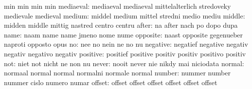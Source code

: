                            min                       min
                           min                       min
                mediaeval: mediaeval                 mediaeval
                           mittelalterlich           stredoveky
                           medievale                 medieval
                   medium: middel                    medium
                           mittel                    stredni
                           medio                     mediu
                   middle: midden                    middle
                           mittig                    nastred
                           centro                    centru
                    after: na                        after
                           nach                      po
                           dopo                      dupa
                     name: naam                      name
                           name                      jmeno
                           nome                      nume
                 opposite: naast                     opposite
                           gegenueber                naproti
                           opposto                   opus
                       no: nee                       no
                           nein                      ne
                           no                        nu
                 negative: negatief                  negative
                           negativ                   negativ
                           negativo                  negativ
                 positive: positief                  positive
                           positiv                   positiv
                           positivo                  positiv
                      not: niet                      not
                           nicht                     ne
                           non                       nu
                    never: nooit                     never
                           nie                       nikdy
                           mai                       niciodata
                   normal: normaal                   normal
                           normal                    normalni
                           normale                   normal
                   number: nummer                    number
                           nummer                    cislo
                           numero                    numar
                   offset: offset                    offset
                           offset                    offset
                           offset                    offset
